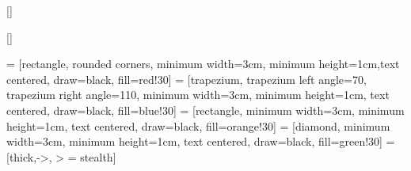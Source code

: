 \DeclareCiteCommand{\parencite}[\mkbibemphparens]
  {%
   }
  {%
   }
  {}
  {}

\DeclareCiteCommand*{\parencite}[\mkbibemphparens]
  {%
   }
  {%
   }
  {}
  {}

\usepackage[automake,acronym,postdot,stylemods,translate=babel]{glossaries-extra}
\usepackage{varwidth}
\usepackage{listings}
\usepackage[protrusion=true,expansion]{microtype}
\usepackage{tikz}
\usetikzlibrary{shapes.geometric, arrows, backgrounds, automata, positioning}
 = [rectangle, rounded corners, minimum width=3cm, minimum height=1cm,text centered, draw=black, fill=red!30]
 = [trapezium, trapezium left angle=70, trapezium right angle=110, minimum width=3cm, minimum height=1cm, text centered, draw=black, fill=blue!30]
 = [rectangle, minimum width=3cm, minimum height=1cm, text centered, draw=black, fill=orange!30]
 = [diamond, minimum width=3cm, minimum height=1cm, text centered, draw=black, fill=green!30]
 = [thick,->, > = stealth]

\usepackage[version=4]{mhchem} %
\usepackage{titling} %
